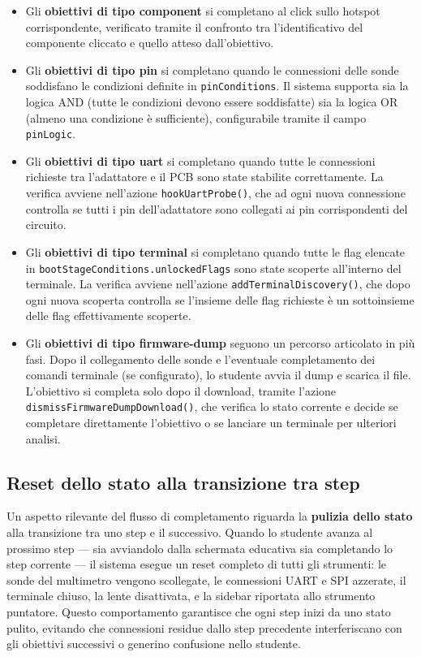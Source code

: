 \begin{itemize}
    \item Gli \textbf{obiettivi di tipo component} si completano al click sullo hotspot corrispondente, verificato tramite il confronto tra l'identificativo del componente cliccato e quello atteso dall'obiettivo.

    \item Gli \textbf{obiettivi di tipo pin} si completano quando le connessioni delle sonde soddisfano le condizioni definite in \texttt{pinConditions}. Il sistema supporta sia la logica AND (tutte le condizioni devono essere soddisfatte) sia la logica OR (almeno una condizione è sufficiente), configurabile tramite il campo \texttt{pinLogic}.

    \item Gli \textbf{obiettivi di tipo uart} si completano quando tutte le connessioni richieste tra l'adattatore e il PCB sono state stabilite correttamente. La verifica avviene nell'azione \texttt{hookUartProbe()}, che ad ogni nuova connessione controlla se tutti i pin dell'adattatore sono collegati ai pin corrispondenti del circuito.

    \item Gli \textbf{obiettivi di tipo terminal} si completano quando tutte le flag elencate in \texttt{bootStageConditions.unlockedFlags} sono state scoperte all'interno del terminale. La verifica avviene nell'azione \texttt{addTerminalDiscovery()}, che dopo ogni nuova scoperta controlla se l'insieme delle flag richieste è un sottoinsieme delle flag effettivamente scoperte.

    \item Gli \textbf{obiettivi di tipo firmware-dump} seguono un percorso articolato in più fasi. Dopo il collegamento delle sonde e l'eventuale completamento dei comandi terminale (se configurato), lo studente avvia il dump e scarica il file. L'obiettivo si completa solo dopo il download, tramite l'azione \texttt{dismissFirmwareDumpDownload()}, che verifica lo stato corrente e decide se completare direttamente l'obiettivo o se lanciare un terminale per ulteriori analisi.
\end{itemize}

\subsection{Reset dello stato alla transizione tra step}

Un aspetto rilevante del flusso di completamento riguarda la \textbf{pulizia dello stato} alla transizione tra uno step e il successivo. Quando lo studente avanza al prossimo step --- sia avviandolo dalla schermata educativa sia completando lo step corrente --- il sistema esegue un reset completo di tutti gli strumenti: le sonde del multimetro vengono scollegate, le connessioni UART e SPI azzerate, il terminale chiuso, la lente disattivata, e la sidebar riportata allo strumento puntatore. Questo comportamento garantisce che ogni step inizi da uno stato pulito, evitando che connessioni residue dallo step precedente interferiscano con gli obiettivi successivi o generino confusione nello studente.

